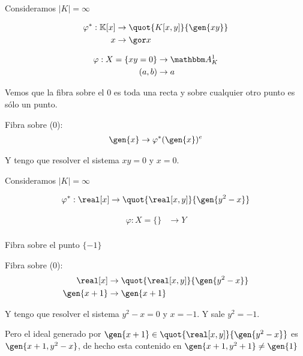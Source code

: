 \begin{example}
	Consideramos $|K| = \infty$

	\begin{align*}
		\varphi^*: \K[x]& \rightarrow \quot{K[x,y]}{\gen{xy}} \\
		x & \rightarrow \cls{x}
	\end{align*}

	\begin{align*}
		\varphi: X=\{ xy=0  \} & \rightarrow \A^1_K \\
		(a,b) & \rightarrow a
	\end{align*}

	Vemos que la fibra sobre el $0$ es toda una recta  y sobre cualquier otro punto es sólo un punto.

	Fibra sobre (0):
	\begin{align*}
		\gen{x} & \rightarrow \varphi^*(\gen{x})^e \\
	\end{align*}

	Y tengo que resolver el sistema $xy=0$ y $x=0$.
\end{example}

\begin{example}
	Consideramos $|K| = \infty$

	\begin{align*}
		\varphi^*: \real[x]& \rightarrow \quot{\real[x,y]}{\gen{y^2-x}} \\
	\end{align*}

	\begin{align*}
		\varphi: X=\{ \} & \rightarrow Y \\
	\end{align*}

	Fibra sobre el punto $\{-1\}$

	Fibra sobre (0):
	\begin{align*}
		\real[x]& \rightarrow \quot{\real[x,y]}{\gen{y^2-x}} \\
		\gen{x+1} & \rightarrow \gen{x+1}
	\end{align*}

	Y tengo que resolver el sistema $y^2-x=0$ y $x=-1$. Y sale $y^2=-1$.

	Pero el ideal generado por $\gen{x+1} \in \quot{\real[x,y]}{\gen{y^2-x}}$ es $\gen{x+1, y^2-x}$, de hecho esta contenido en $\gen{x+1, y^2+1}\neq \gen{1}$
\end{example}

